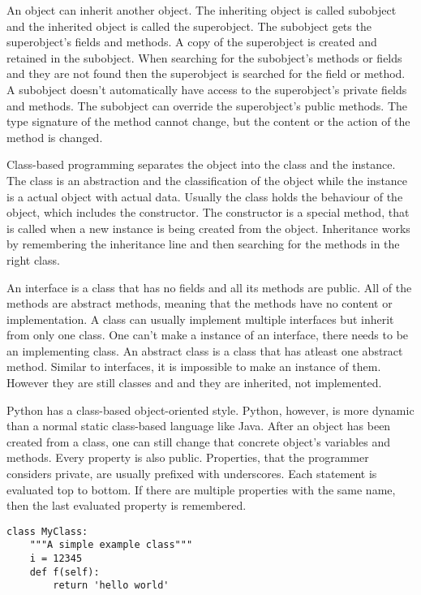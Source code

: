 An object can inherit another object. The inheriting object is called subobject and the inherited object is called the superobject. The subobject gets the superobject's fields and methods. A copy of the superobject is created and retained in the subobject. When searching for the subobject's methods or fields and they are not found then the superobject is searched for the field or method. A subobject doesn't automatically have access to the superobject's private fields and methods. The subobject can override the superobject's public methods. The type signature of the method cannot change, but the content or the action of the method is changed.

Class-based programming separates the object into the class and the instance.
The class is an abstraction and the classification of the object while the
instance is a actual object with actual data. Usually the class holds the
behaviour of the object, which includes the constructor. The constructor is a
special method, that is called when a new instance is being created from the
object. Inheritance works by remembering the inheritance line and then searching
for the methods in the right class.

An interface is a class that has no fields and all its methods are public. All
of the methods are abstract methods, meaning that the methods have no content or
implementation. A class can usually implement multiple interfaces but inherit
from only one class. One can't make a instance of an interface, there needs to
be an implementing class. An abstract class is a class that has atleast one
abstract method. Similar to interfaces, it is impossible to make an instance of
them. However they are still classes and and they are inherited, not
implemented.

Python has a class-based object-oriented style. Python, however, is more dynamic
than a normal static class-based language like Java. After an object has been
created from a class, one can still change that concrete object's variables and
methods. Every property is also public. Properties, that the programmer
considers private, are usually prefixed with underscores. Each statement is
evaluated top to bottom. If there are multiple properties with the same name,
then the last evaluated property is remembered.
\begin{verbatim}
class MyClass:
    """A simple example class"""
    i = 12345
    def f(self):
        return 'hello world'
\end{verbatim}

